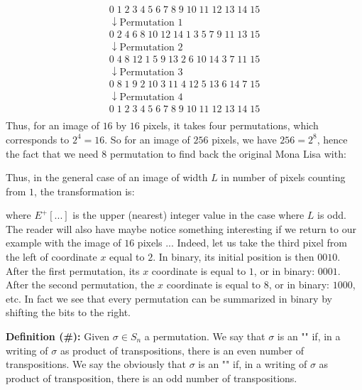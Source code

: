 	\pagebreak
	\begin{tcolorbox}[colframe=black,colback=white,sharp corners]
	\begin{gather*}
		0\; 1\; 2\; 3\; 4\; 5\; 6\; 7\; 8\; 9\; 10\; 11\; 12\; 13\; 14\; 15\\
		\downarrow \text{Permutation }1\\
		0\; 2\; 4\; 6\; 8\; 10\; 12\; 14\; 1\; 3\; 5\; 7\; 9\; 11\; 13\; 15\\
		\downarrow \text{Permutation }2\\
		0\; 4\; 8\; 12\; 1\; 5\; 9\; 13\; 2\; 6\; 10\; 14\; 3\; 7\; 11\; 15\\
		\downarrow \text{Permutation }3\\
		0\; 8\; 1\; 9\; 2\; 10\; 3\; 11\; 4\; 12\; 5\; 13\; 6\; 14\; 7\; 15\\
		\downarrow \text{Permutation }4\\
0\; 1\; 2\; 3\; 4\; 5\; 6\; 7\; 8\; 9\; 10\; 11\; 12\; 13\; 14\; 15\\
	\end{gather*}
	Thus, for an image of $16$ by $16$ pixels, it takes four permutations, which corresponds to $2^4=16$. So for an image of $256$ pixels, we have $256=2^8$, hence the fact that we need $8$ permutation to find back the original Mona Lisa with:
	
	Thus, in the general case of an image of width $L$ in number of pixels counting from $1$, the transformation is:
	
	where $E^+[...]$ is the upper (nearest) integer value in the case where $L$ is odd.\\
	
	The reader will also have maybe notice something interesting if we return to our example with the image of $16$ pixels ... Indeed, let us take the third pixel from the left of coordinate $x$ equal to $2$. In binary, its initial position is then $0010$. After the first permutation, its $x$ coordinate is equal to $1$, or in binary: $0001$. After the second permutation, the $x$ coordinate is equal to $8$, or in binary: $1000$, etc. In fact we see that every permutation can be summarized in binary by shifting the bits to the right.
	\end{tcolorbox}
	\textbf{Definition (\#\mydef):} Given $\sigma \in S_n$ a permutation. We say that $\sigma$ is an "" if, in a writing of $\sigma$ as product of transpositions, there is an even number of transpositions. We say the obviously that $\sigma$ is an "" if, in a writing of $\sigma$ as product of transposition, there is an odd number of transpositions.
	
